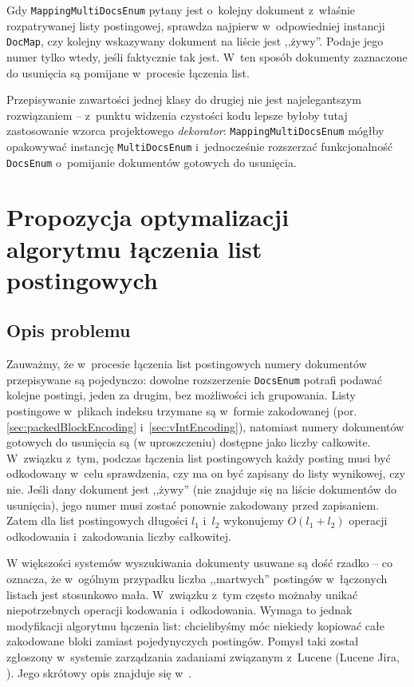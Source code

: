 Gdy \texttt{MappingMultiDocsEnum} pytany jest o~kolejny dokument z~właśnie rozpatrywanej listy postingowej, sprawdza najpierw w~odpowiedniej instancji \texttt{DocMap}, czy kolejny wskazywany dokument na liście jest ,,żywy''. Podaje jego numer tylko wtedy, jeśli faktycznie tak jest. W~ten sposób dokumenty zaznaczone do usunięcia są pomijane w~procesie łączenia list. 

Przepisywanie zawartości jednej klasy do drugiej nie jest najelegantszym rozwiązaniem -- z~punktu widzenia czystości kodu lepsze byłoby tutaj zastosowanie wzorca projektowego \emph{dekorator}: \texttt{MappingMultiDocsEnum} mógłby opakowywać instancję \texttt{MultiDocsEnum} i~jednocześnie rozszerzać funkcjonalność \texttt{DocsEnum} o~pomijanie dokumentów gotowych do usunięcia.

\section{Propozycja optymalizacji algorytmu łączenia list postingowych}

\subsection{Opis problemu}

Zauważmy, że w~procesie łączenia list postingowych numery dokumentów przepisywane są pojedynczo: dowolne rozszerzenie \texttt{DocsEnum} potrafi podawać kolejne postingi, jeden za drugim, bez możliwości ich grupowania. Listy postingowe w~plikach indeksu trzymane są w~formie zakodowanej (por. \ref{sec:packedBlockEncoding} i~\ref{sec:vIntEncoding}), natomiast numery dokumentów gotowych do usunięcia są (w uproszczeniu) dostępne jako liczby całkowite. W~związku z~tym, podczas łączenia list postingowych każdy posting musi być odkodowany w~celu sprawdzenia, czy ma on być zapisany do listy wynikowej, czy nie. Jeśli dany dokument jest ,,żywy'' (nie znajduje się na liście dokumentów do usunięcia), jego numer musi zostać ponownie zakodowany przed zapisaniem. Zatem dla list postingowych długości $l_1$ i~$l_2$ wykonujemy $O(l_1 + l_2)$ operacji odkodowania i~zakodowania liczby całkowitej.

W większości systemów wyszukiwania dokumenty usuwane są dość rzadko -- co oznacza, że w~ogólnym przypadku liczba ,,martwych'' postingów w~łączonych listach jest stosunkowo mała. W~związku z~tym często możnaby unikać niepotrzebnych operacji kodowania i~odkodowania. Wymaga to jednak modyfikacji algorytmu łączenia list: chcielibyśmy móc niekiedy kopiować całe zakodowane bloki zamiast pojedynyczych postingów. Pomysł taki został zgłoszony w~systemie zarządzania zadaniami związanym z~Lucene (Lucene Jira, \cite{jira}). Jego skrótowy opis znajduje się w~\cite{idea}.

